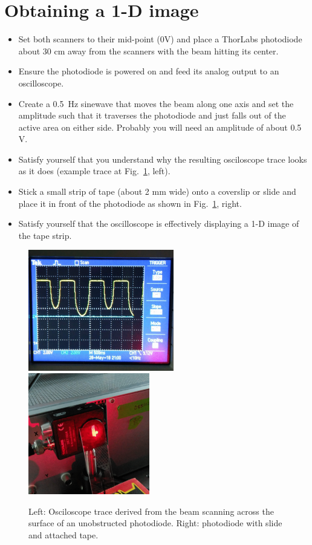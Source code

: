 \documentclass[a4paper]{report}
\begin{document}
\clearpage
\section{Obtaining a 1-D image}
\begin{itemize}
    \setlength\itemsep{0.15em}
    \item Set both scanners to their mid-point (0V) and place a ThorLabs photodiode about 30 cm away from the scanners with the beam hitting its center. 
    \item Ensure the photodiode is powered on and feed its analog output to an oscilloscope. 
    \item Create a 0.5~Hz sinewave that moves the beam along one axis and set the amplitude such that it traverses the photodiode and just falls out of the active area on either side. Probably you will need an amplitude of about 0.5 V.
    \item Satisfy yourself that you understand why the resulting osciloscope trace looks as it does (example trace at Fig.~\ref{PD}, left).
    \item Stick a small strip of tape (about 2 mm wide) onto a coverslip or slide and place it in front of the photodiode as shown in Fig.~\ref{PD}, right. 
    \item Satisfy yourself that the oscilloscope is effectively displaying a 1-D image of the tape strip. 
\end{itemize}

\begin{figure}[h]
\centering
\includegraphics[width=2.5in]{trace_photodiode.png}
\includegraphics[width=2.08in]{PhotoDiode_with_tape.png}
\caption{Left: Osciloscope trace derived from the beam scanning across the surface of an unobstructed photodiode.
         Right: photodiode with slide and attached tape. }
\label{PD}
\end{figure}
\end{document}
